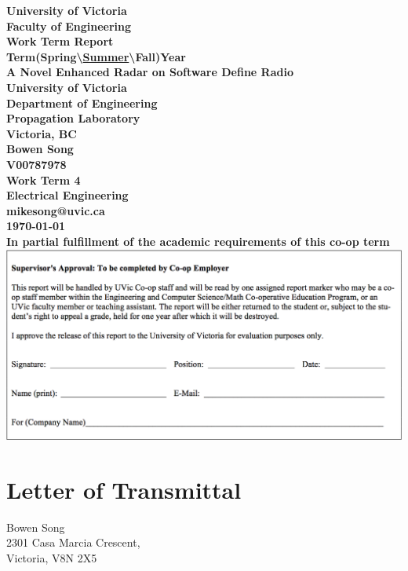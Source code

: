 \documentclass[letterpaper, 12 pt, conference]{report}
\numberwithin{figure}{section}
\begin{document}
{ %

\begin{center}
\textbf{
University of Victoria\\
Faculty of Engineering\\ Work Term Report\\
Term(Spring\textbackslash{}\underline{Summer}\textbackslash{}Fall)Year\\
\vspace{0.5cm}
{ A Novel Enhanced Radar on Software Define Radio
}\\
\vspace{0.5cm}
University of Victoria\\
Department of Engineering\\ Propagation Laboratory\\
Victoria, BC\\
\vspace{0.5cm}
Bowen Song\\
V00787978\\
Work Term 4\\
Electrical Engineering\\
mikesong@uvic.ca\\
\today \\
\vspace{1cm}
In partial fulfillment of the academic requirements of this co-op term\\
\vspace{1cm}
}
\includegraphics[width=\linewidth]{supervisor_approval.png}
\end{center}
\newpage
\section{Letter of Transmittal}
\fontsize{12}{12}\selectfont
Bowen Song\\
2301 Casa Marcia Crescent,\\
Victoria, V8N 2X5\\

}
\end{document}

